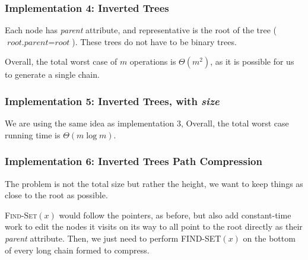 \subsubsection{Implementation 4: Inverted Trees}

Each node has \textit{parent} attribute, and representative is the root of the tree ($\textit{root.parent} = \textit{root}$). These trees do not have to be binary trees.


Overall, the total worst case of $m$  operations is $\Theta(m^2)$, as it is possible for us to generate a single chain. 

\subsubsection{Implementation 5: Inverted Trees, with \textit{size}}

We are using the same  idea as implementation 3, Overall, the total worst case running time is $\Theta(m \log m)$.

\subsubsection{Implementation 6: Inverted Trees Path Compression}

The problem is not the total size but rather the height, we want to keep things as close to the root as possible.

\textsc{Find-Set}$(x)$ would follow the pointers, as before, but also add constant-time work to edit the nodes it visits on its way to all point to the root directly as their \textit{parent} attribute. Then, we just need to perform \textsc{FIND-SET}$(x)$ on the bottom of every long chain formed to compress.

